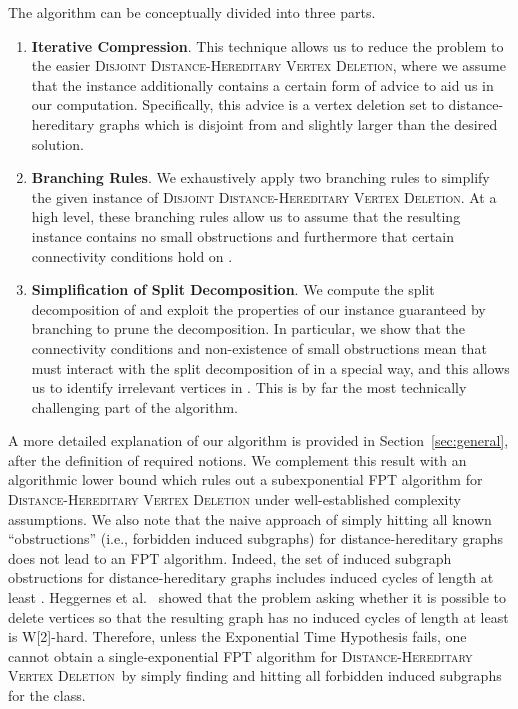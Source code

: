 \documentclass[11pt]{elsarticle}
\newcommand{\DHVD}{\textsc{Distance-Hereditary Vertex Deletion}}
\begin{document}
The algorithm can be conceptually divided into three parts. 

\begin{enumerate}
\item \textbf{Iterative Compression}. This technique allows us to reduce the problem to the easier \textsc{Disjoint Distance-Hereditary Vertex Deletion}, where we assume that the instance additionally contains a certain form of advice to aid us in our computation. Specifically, this advice is a vertex deletion set  to distance-hereditary graphs which is disjoint from and slightly larger than the desired solution.
  
  \item \textbf{Branching Rules}. We exhaustively apply two branching rules to simplify the given instance of \textsc{Disjoint Distance-Hereditary Vertex Deletion}. At a high level, these branching rules allow us to assume that the resulting instance contains no small obstructions and furthermore that certain connectivity conditions hold on .
  
  \item \textbf{Simplification of Split Decomposition}. We compute the split decomposition of  and exploit the properties of our instance  guaranteed by branching to prune the decomposition. In particular, we show that the connectivity conditions and non-existence of small obstructions mean that  must interact with the split decomposition of  in a special way, and this allows us to identify irrelevant vertices in . This is by far the most technically challenging part of the algorithm.
\end{enumerate}

A more detailed explanation of our algorithm is provided in Section~\ref{sec:general}, after the definition of required notions. We complement this result with an algorithmic lower bound which rules out a subexponential FPT algorithm for \textsc{Distance-Hereditary Vertex Deletion} under well-established complexity assumptions. We also note that the naive approach of simply hitting all known ``obstructions'' (i.e., forbidden induced subgraphs) for distance-hereditary graphs does not lead to an FPT algorithm. Indeed, the set of induced subgraph obstructions for distance-hereditary graphs includes induced cycles of length at least .
Heggernes et al.~\cite{Heggernes2013} showed that 
the problem asking whether it is possible to delete  vertices so that the resulting graph has no induced cycles of length at least  is W[2]-hard.
Therefore, unless the Exponential Time Hypothesis fails, one cannot obtain a single-exponential FPT algorithm for \DHVD\ by simply finding and hitting all forbidden induced subgraphs for the class.
\end{document}
